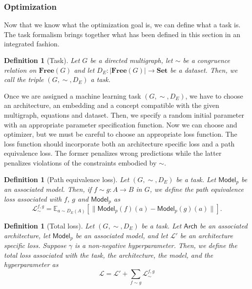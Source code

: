 \documentclass[12pt,a4paper,openright,twoside]{report}
\theoremstyle{plain}
\newtheorem{definition}[proposition]{Definition}
\theoremstyle{definition}
\begin{document}
\subsubsection{Optimization}

Now that we know what the optimization goal is, we can define what a task is. The task formalism brings together what has been defined in this section in an integrated fashion.

\begin{definition}[Task]
  Let $G$ be a directed multigraph, let ${\sim}$ be a congruence relation on $\mathbf{Free}(G)$ and let $D_E: |\mathbf{Free}(G)| \to \mathbf{Set}$ be a dataset. Then, we call the triple $(G,{\sim},D_E)$ a task.
\end{definition}

Once we are assigned a machine learning task $(G,{\sim},D_E)$, we have to choose an architecture, an embedding and a concept compatible with the given multigraph, equations and dataset. Then, we specify a random initial parameter with an appropriate parameter specification function. Now we can choose and optimizer, but we must be careful to choose an appropriate loss function. The loss function should incorporate both an architecture specific loss and a path equivalence loss. The former penalizes wrong predictions while the latter penalizes violations of the constraints embodied by ${\sim}$.

\begin{definition}[Path equivalence loss]
  Let $(G,{\sim},D_E)$ be a task. Let $\mathsf{Model}_p$ be an associated model. Then, if $f \sim g: A \to B$ in $G$, we define the path equivalence loss associated with $f$, $g$ and $\mathsf{Model}_p$ as 
  \[\mathcal{L}_{\sim}^{f,g} = \mathbb{E}_{a \sim D_E(A)}[\|\mathsf{Model}_p(f)(a) - \mathsf{Model}_p(g)(a)\|].\]  
\end{definition}

\begin{definition}[Total loss]
  Let $(G,{\sim},D_E)$ be a task. Let $\mathsf{Arch}$ be an associated architecture, let $\mathsf{Model}_p$ be an associated model, and let $\mathcal{L}'$ be an architecture specific loss. Suppose $\gamma$ is a non-negative hyperparameter. Then, we define the total loss associated with the task, the architecture, the model, and the hyperparameter as
  \begin{equation}
    \label{eq: sumoflosses}
    \mathcal{L} = \mathcal{L}' + \sum_{f \sim g}\mathcal{L}_{\sim}^{f,g}
  \end{equation}
\end{definition}
\end{document}
